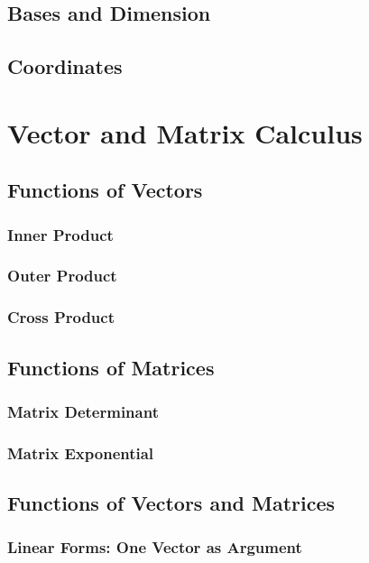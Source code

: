 \section{Bases and Dimension}
\section{Coordinates}

\chapter{Vector and Matrix Calculus}
\section{Functions of Vectors}
\subsection{Inner Product}
\subsection{Outer Product}
\subsection{Cross Product}
\section{Functions of Matrices}
\subsection{Matrix Determinant}


\subsection{Matrix Exponential}



\section{Functions of Vectors and Matrices}
\subsection{Linear Forms: One Vector as Argument}
